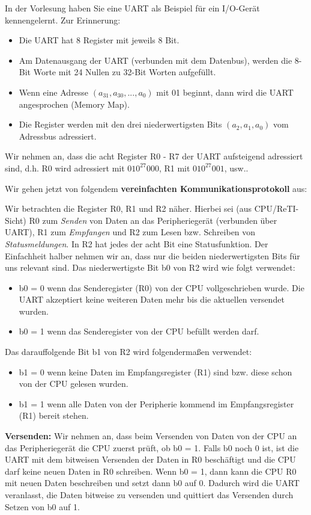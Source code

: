 \begin{exercise}
In der Vorlesung haben Sie eine UART als Beispiel für ein I/O-Gerät kennengelernt. 
Zur Erinnerung:
\begin{itemize}
\item Die UART hat 8 Register mit jeweils 8 Bit.
\item Am Datenausgang der UART (verbunden mit dem Datenbus), werden die 8-Bit Worte mit 24 Nullen zu 32-Bit Worten aufgefüllt.
\item Wenn eine Adresse $(a_{31}, a_{30}, ..., a_0)$ mit 01 beginnt, dann wird die UART angesprochen (Memory Map).
\item Die Register werden mit den drei niederwertigsten Bits $(a_2, a_1, a_0)$ vom Adressbus adressiert.
\end{itemize}
Wir nehmen an, dass die acht Register R0 - R7 der UART aufsteigend adressiert sind, d.h. R0 wird adressiert mit $010^{27}000$, R1 mit $010^{27}001$, usw..

Wir gehen jetzt von folgendem \textbf{vereinfachten Kommunikationsprotokoll} aus:

Wir betrachten die Register R0, R1 und R2 näher. 
Hierbei sei (aus CPU/ReTI-Sicht) R0 zum \emph{Senden} von Daten an das Peripheriegerät (verbunden über UART), 
R1 zum \emph{Empfangen} und R2 zum Lesen bzw. Schreiben von \emph{Statusmeldungen}.
In R2 hat jedes der acht Bit eine Statusfunktion.
Der Einfachheit halber nehmen wir an, dass nur die beiden niederwertigsten Bits für uns relevant sind. 
Das niederwertigste Bit b0 von R2 wird wie folgt verwendet:
\begin{itemize}
\item b0 = 0 wenn das Senderegister (R0) von der CPU vollgeschrieben wurde. 
Die UART akzeptiert keine weiteren Daten mehr bis die aktuellen versendet wurden.
\item b0 = 1 wenn das Senderegister von der CPU befüllt werden darf.
\end{itemize}
Das darauffolgende Bit b1 von R2 wird folgendermaßen verwendet:
\begin{itemize}
\item b1 = 0 wenn keine Daten im Empfangsregister (R1) sind bzw. diese schon von der CPU gelesen wurden.
\item b1 = 1 wenn alle Daten von der Peripherie kommend im Empfangsregister (R1) bereit stehen.
\end{itemize}

\textbf{Versenden:} Wir nehmen an, dass beim Versenden von Daten von der CPU an das Peripheriegerät
die CPU zuerst prüft, ob b0 = 1. Falls b0 noch 0 ist, ist die UART mit dem bitweisen Versenden 
der Daten in R0 beschäftigt und die CPU darf keine neuen Daten in R0 schreiben.
Wenn b0 = 1, dann kann die CPU R0 mit neuen Daten beschreiben und setzt dann b0 auf 0.
Dadurch wird die UART veranlasst, die Daten bitweise zu versenden und quittiert das Versenden durch
Setzen von b0 auf 1.


\end{exercise}
